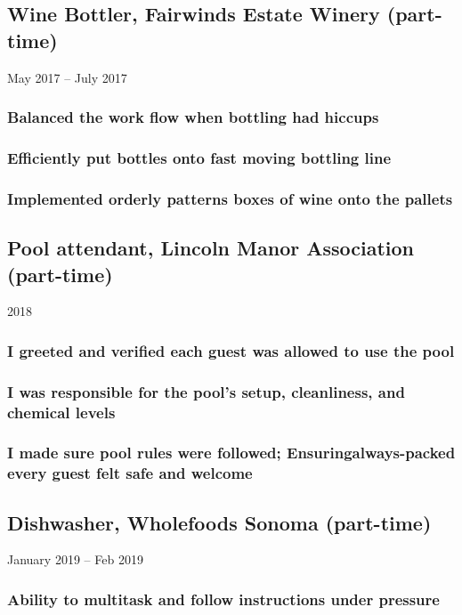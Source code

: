 \documentclass{article}
\begin{document}
	\subsection{Wine Bottler, Fairwinds Estate Winery (part-time)} May 2017 – July 2017
		\vspace{-2mm}
		\subsubsection{Balanced the work flow when bottling had hiccups}
		\subsubsection{Efficiently put bottles onto fast moving bottling line}
		\subsubsection{Implemented orderly patterns boxes of wine onto the pallets}

	\subsection{Pool attendant, Lincoln Manor Association (part-time)} 2018
		\vspace{-2mm}

		\subsubsection{I greeted and verified each guest was allowed to use the pool}
		\subsubsection{I was responsible for the pool's setup, cleanliness, and chemical levels}
		\subsubsection{I made sure pool rules were followed; Ensuringalways-packed every guest felt safe and welcome}

	\subsection{Dishwasher, Wholefoods Sonoma (part-time)} January 2019 – Feb 2019
		\vspace{-2mm}
		\subsubsection{Ability to multitask and follow instructions under pressure}
\end{document}
